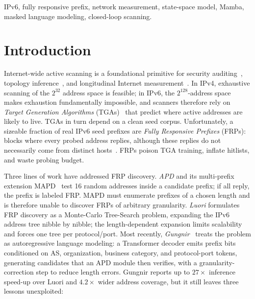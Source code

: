 \documentclass[conference]{IEEEtran}
\begin{document}
\begin{IEEEkeywords}
IPv6, fully responsive prefix, network measurement, state-space model,
Mamba, masked language modeling, closed-loop scanning.
\end{IEEEkeywords}

\section{Introduction}\label{sec:intro}

Internet-wide active scanning is a foundational primitive for security
auditing~\cite{durumeric2013zmap}, topology
inference~\cite{vermeulen2020diamond}, and longitudinal Internet
measurement~\cite{rye2023ipv6}.  In IPv4, exhaustive scanning of the
$2^{32}$ address space is feasible; in IPv6, the $2^{128}$-address space
makes exhaustion fundamentally impossible, and scanners therefore rely on
\emph{Target Generation Algorithms} (TGAs)~\cite{murdock2017target,
yang2022sixforest, hou2021sixhit, song2022det, yang2022sixgraph} that
predict where active addresses are likely to live.  TGAs in turn depend
on a clean seed corpus.  Unfortunately, a sizeable fraction of real IPv6
seed prefixes are \emph{Fully Responsive Prefixes} (FRPs): blocks where
every probed address replies, although these replies do not necessarily
come from distinct hosts~\cite{gasser2018clusters,zirngibl2022rusty}.
FRPs poison TGA training, inflate hitlists, and waste probing budget.

Three lines of work have addressed FRP discovery.  \emph{APD} and its
multi-prefix extension MAPD~\cite{gasser2018clusters} test 16 random
addresses inside a candidate prefix; if all reply, the prefix is labeled
FRP.  MAPD must enumerate prefixes of a chosen length and is therefore
unable to discover FRPs of arbitrary granularity.  \emph{Luori}
\cite{luori2024} formulates FRP discovery as a Monte-Carlo Tree-Search
problem, expanding the IPv6 address tree nibble by nibble; the
length-dependent expansion limits scalability and forces one tree per
protocol/port.  Most recently, \emph{Gungnir}~\cite{gungnir2025} treats
the problem as autoregressive language modeling: a Transformer decoder
emits prefix bits conditioned on AS, organization, business category, and
protocol-port tokens, generating candidates that an APD module then
verifies, with a granularity-correction step to reduce length errors.
Gungnir reports up to $27\times$ inference speed-up over Luori and
$4.2\times$ wider address coverage, but it still leaves three lessons
unexploited:
\end{document}
